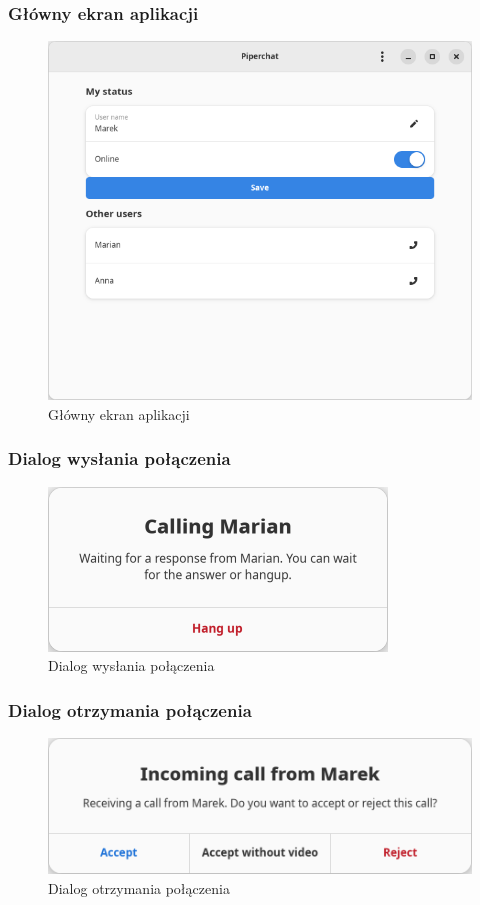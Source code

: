 \subsubsection{Główny ekran aplikacji}

\begin{figure}[H]
	\centering
	\includegraphics[width=.6\textwidth]{img/gui/screen_main}
	\caption{Główny ekran aplikacji}
\end{figure}

\subsubsection{Dialog wysłania połączenia}

\begin{figure}[H]
	\centering
	\includegraphics[width=.6\textwidth]{img/gui/screen_call_start}
	\caption{Dialog wysłania połączenia}
\end{figure}

\subsubsection{Dialog otrzymania połączenia}

\begin{figure}[H]
	\centering
	\includegraphics[width=.6\textwidth]{img/gui/screen_call_recv}
	\caption{Dialog otrzymania połączenia}
\end{figure}

